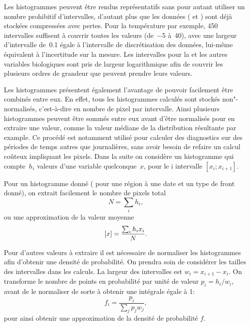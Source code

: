 Les histogrammes peuvent être rendus représentatifs sans pour autant utiliser un nombre prohibitif d'intervalles, d'autant plus que les données ( et ) sont déjà stockées compressées avec pertes. Pour la température par exemple, 450 intervalles suffisent à couvrir toutes les valeurs (de~\qty{-5}{\dC} à~\qty{40}{\dC}), avec une largeur d'intervalle de~\qty{0.1}{\dC} égale à l'intervalle de discrétisation des données, lui-même équivalent à l'incertitude sur la mesure.
Les intervalles pour la  et les autres variables biologiques sont pris de largeur logarithmique afin de couvrir les plusieurs ordres de grandeur que peuvent prendre leurs valeurs.

Les histogrammes présentent également l'avantage de pouvoir facilement être combinés entre eux.
En effet, tous les histogrammes calculés sont stockés non"-normalisés, c'est-à-dire en nombre de pixel par intervalle. Ainsi plusieurs histogrammes peuvent être sommés entre eux avant d'être normalisés pour en extraire une valeur, comme la valeur médiane de la distribution résultante par example.
Ce procédé est notamment utilisé pour calculer des diagnostics sur des périodes de temps autres que journalières, sans avoir besoin de refaire un calcul coûteux impliquant les pixels.
Dans la suite on considère un histogramme qui compte~\(h_i\) valeurs d'une variable quelconque~\(x\), pour le i\ieme{} intervalle \(\left[x_i; x_{i+1} \right]\).

Pour un histogramme donné ( pour une région à une date et un type de front donné), on extrait facilement le nombre de pixels total
\begin{equation}
  N = \sum_i h_i,
\end{equation}
ou une approximation de la valeur moyenne
\begin{equation}
  \left[x\right] = \frac{\sum_i h_i x_i} {N}.
\end{equation} %

Pour d'autres valeurs à extraire il est nécessaire de normaliser les histogrammes afin d'obtenir une densité de probabilité. On prendra soin de considérer les tailles des intervalles dans les calculs.
La largeur des intervalles est \(w_i = x_{i+1}-x_i\). On transforme le nombre de points en probabilité par unité de valeur \(p_i = h_i / w_i \), avant de le normaliser de sorte à obtenir une intégrale égale à 1:
\begin{equation}
  f_i = \frac{p_i} {\sum_j p_j w_j},
\end{equation}
pour ainsi obtenir une approximation de la densité de probabilité \(f\).


